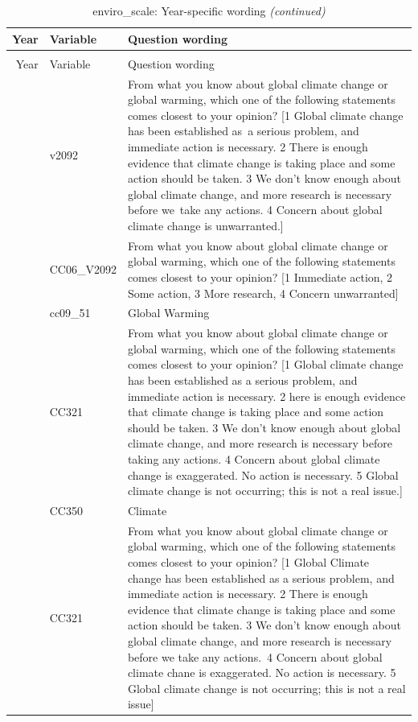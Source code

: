 \documentclass[
  12pt]{article}
\begin{document}
\begin{longtable}[t]{rl>{\raggedright\arraybackslash}p{10cm}}
\caption{\label{tab:unnamed-chunk-5}enviro\_scale: Year-specific wording}\\
\toprule
Year & Variable & Question wording\\
\midrule
\endfirsthead
\caption[]{enviro\_scale: Year-specific wording \textit{(continued)}}\\
\toprule
Year & Variable & Question wording\\
\midrule
\endhead

\endfoot
\bottomrule
\endlastfoot
2006 & v2092 & From what you know about global climate change or global warming, which one of the following statements comes closest to your opinion? [1 Global climate change has been established as a serious problem, and immediate action is necessary. 2 There is enough evidence that climate change is taking place and some action should be taken. 3 We don't know enough about global climate change, and more research is necessary before we take any actions. 4 Concern about global climate change is unwarranted.]\\
\addlinespace
2007 & CC06\_V2092 & From what you know about global climate change or global warming, which one of the following statements comes closest to your opinion? [1 Immediate action, 2 Some action, 3 More research, 4 Concern unwarranted]\\
\addlinespace
2009 & cc09\_51 & Global Warming\\
\addlinespace
2010 & CC321 & From what you know about global climate change or global warming, which one of the following statements comes closest to your opinion? [1 Global climate change has been established as a serious problem, and immediate action is necessary. 2 here is enough evidence that climate change is taking place and some action should be taken. 3 We don’t know enough about global climate change, and more research is necessary before taking any actions. 4 Concern about global climate change is exaggerated. No action is necessary. 5 Global climate change is not occurring; this is not a real issue.]\\
\addlinespace
2011 & CC350 & Climate\\
\addlinespace
2012 & CC321 & From what you know about global climate change or global warming, which one of the following statements comes closest to your opinion? [1 Global Climate change has been established as a serious problem, and immediate action is necessary. 2 There is enough evidence that climate change is taking place and some action should be taken. 3 We don't know enough about global climate change, and more research is necessary before we take any actions. 4 Concern about global climate chane is exaggerated. No action is necessary. 5 Global climate change is not occurring; this is not a real issue]\\*
\end{longtable}
\endgroup{}
\end{document}
